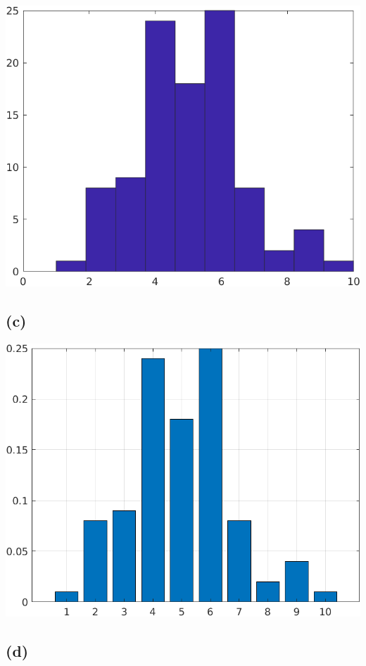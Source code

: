 \documentclass[a4paper]{scrartcl}
\begin{document}
\begin{center}
	\includegraphics*[scale = 0.5]{question4b.png}
\end{center}

\subsection*{(c)}

\begin{center}
	\includegraphics*[scale = 0.5]{question4c.png}
\end{center}

\subsection*{(d)}
\end{document}
